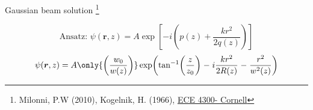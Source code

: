 \documentclass[12pt, dvipsnames]{beamer}
\numberwithin{equation}{section}
\newcommand\blfootnote[1]{%
	\begingroup
	\renewcommand\thefootnote{}\footnote{#1}%
	\addtocounter{footnote}{-1}%
	\endgroup
}
\begin{document}
\begin{frame}[t]{Gaussian beam solution } \blfootnote{Milonni, P.W (2010), Kogelnik, H. (1966), \href{https://www.youtube.com/playlist?list=PLyWzPf87clvEb8T3Xf30tMaUqdbVchrNY}{ECE 4300- Cornell}}
	\vspace{-16pt}
	$$\text{Ansatz: }\psi(\boldsymbol{r},z)= A \exp\left[-i\left(p(z) + \frac{kr^2}{2q(z)}\right)\right]$$\pause
	$$\psi(\boldsymbol{r},z)=A
	\only{\left(\frac{w_0}{w(z)}\right)}
	\exp(
	{\tan[-1](\frac{z}{z_0})}\;
	{-\;i\frac{kr^2}{2R(z)}}\;
	{-\;\frac{r^2}{w^2(z)}}
	)$$\pause
	
\end{frame}
\end{document}
